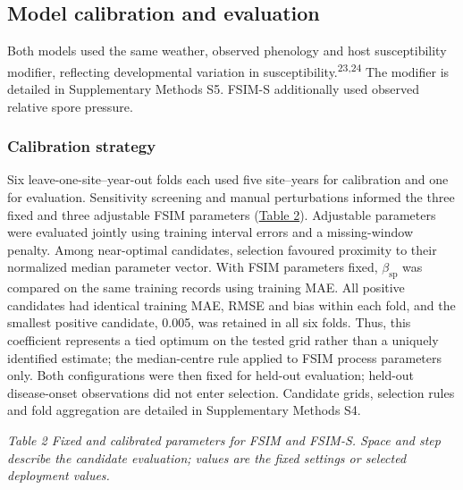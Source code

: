 \documentclass{article}
\newcommand{\manualcaption}[1]{%
  \begin{center}%
  \fontsize{10}{12}\selectfont\itshape #1%
  \end{center}%
}
\begin{document}
\subsection{Model calibration and
evaluation}\label{model-calibration-and-evaluation}

Both models used the same weather, observed phenology and host
susceptibility modifier, reflecting developmental variation in
susceptibility.\textsuperscript{23,24} The modifier is detailed in
Supplementary Methods S5. FSIM-S additionally used observed relative spore pressure.

\subsubsection{Calibration strategy}\label{calibration-strategy}

Six leave-one-site--year-out folds each used five site--years for
calibration and one for evaluation. Sensitivity screening and manual
perturbations informed the three fixed and three adjustable FSIM
parameters (\hyperref[_Ref226058574]{Table 2}). Adjustable parameters
were evaluated jointly using training interval errors and a missing-window
penalty. Among near-optimal candidates, selection favoured proximity to
their normalized median parameter vector. With FSIM parameters fixed,
\(\beta_{\mathrm{sp}}\) was compared on the same training records using
training MAE. All positive candidates had identical training MAE, RMSE and
bias within each fold, and the smallest positive candidate, 0.005, was
retained in all six folds. Thus, this coefficient represents a tied
optimum on the tested grid rather than a uniquely identified estimate;
the median-centre rule applied to FSIM process parameters only.
Both configurations were then fixed for held-out evaluation; held-out
disease-onset observations did not enter selection. Candidate grids,
selection rules and fold aggregation are detailed in Supplementary
Methods S4.

\clearpage
\protect{}\label{_Ref226058574}{}
\manualcaption{Table 2 Fixed and calibrated parameters for FSIM and FSIM-S.
Space and step describe the candidate evaluation; values
are the fixed settings or selected deployment values.}
\end{document}
